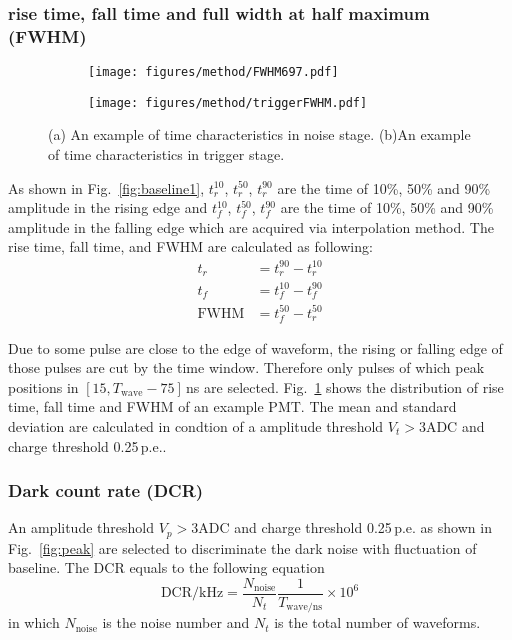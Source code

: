 \subsubsection{rise time, fall time and full width at half maximum (FWHM)}
\begin{figure}[!htbp]
    \centering
    \begin{subfigure}[t]{0.49\textwidth}
        \texttt{[image: figures/method/FWHM697.pdf]}
        \caption{}
        \label{fig:risefallFWHM}
    \end{subfigure}
    \begin{subfigure}[t]{0.49\textwidth}
        \texttt{[image: figures/method/triggerFWHM.pdf]}
        \caption{}
        \label{fig:triggerFWHM}
    \end{subfigure}
    \caption{(a) An example of time characteristics in noise stage. (b)An example of time characteristics in trigger stage.}
\end{figure}
As shown in Fig.~\ref{fig:baseline1}, $t^{10}_r$, $t^{50}_r$, $t^{90}_r$ are the time of 10\%, 50\% and 90\% amplitude in the rising edge and $t^{10}_f$, $t^{50}_f$, $t^{90}_f$ are the time of 10\%, 50\% and 90\% amplitude in the falling edge which are acquired via interpolation method. The rise time, fall time, and FWHM are calculated as following:
\begin{align}
    t_r &= t^{90}_r - t^{10}_r\\
    t_f &= t^{10}_f - t^{90}_f\\
    \mathrm{FWHM} &= t^{50}_f - t^{50}_r
\end{align}

Due to some pulse are close to the edge of waveform, the rising or falling edge of those pulses are cut by the time window. Therefore only pulses of which peak positions in $[15, T_{\mathrm{wave}}-75]$\,ns are selected. Fig.~\ref{fig:risefallFWHM} shows the distribution of rise time, fall time and FWHM of an example PMT. The mean and standard deviation are calculated in condtion of a amplitude threshold $V_{t}>3\mathrm{ADC}$ and charge threshold 0.25\,p.e..

\subsubsection{Dark count rate (DCR)}
An amplitude threshold $V_{p}>3\mathrm{ADC}$ and charge threshold 0.25\,p.e. as shown in Fig.~\ref{fig:peak} are selected to discriminate the dark noise with fluctuation of baseline. The DCR equals to the following equation
\begin{equation}
    \mathrm{DCR/kHz} = \frac{N_{\mathrm{noise}}}{N_{t}}\frac{1}{T_{\mathrm{wave}/\mathrm{ns}}}\times 10^{6}
\end{equation}
in which $N_{\mathrm{noise}}$ is the noise number and $N_{t}$ is the total number of waveforms.

